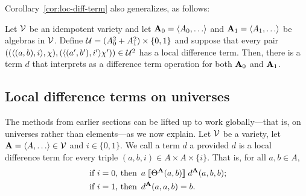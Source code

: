 Corollary~\ref{cor:loc-diff-term} also generalizes, as follows:
\begin{cor}
  \label{cor:mix-loc-diff-term}
  Let $\mathcal{V}$ be an idempotent variety and let
  $\bA_0 = \<A_0, \dots\>$ and   $\bA_1 = \<A_1, \dots\>$ be algebras in $\mathcal{V}$. Define
  $\mathcal{U}  = (A_0^2 + A_1^2)\times \{0,1\}$
  and suppose that every pair
  $((\langle(a, b), i\rangle, \chi), (\langle(a', b'), i'\rangle\chi')) \in \mathcal{U}^2$
  has a local difference term. Then, there is a term $d$ that interprets as a
  difference term operation for both $\mathbf{A}_0$ and $\mathbf{A}_1$.
\end{cor}





\subsection{Local difference terms on universes}
\label{sec:glob-local-diff}
The methods from earlier sections can be lifted up to work globally---that is,
on universes rather than elements---as we now explain. 
Let $\mathcal{V}$ be a variety, let $\bA = \<A, \dots\> \in \sV$ 
and $i\in \{0,1\}$.
We call a term $d$ a 
provided $d$ is a local difference term for every triple
$(a,b,i) \in A \times A \times \{i\}$. That is, for all $a, b \in A$,
\begin{align}
\text{ if $i=0$, then } & \, a \comr{\Cg^{\bA}(a,b)} d^{\bA}(a,b,b);
\label{eq:global-diff-triple}\\
\text{ if $i=1$, then } & \,
d^{\bA}(a,a,b) = b. 
\end{align}

